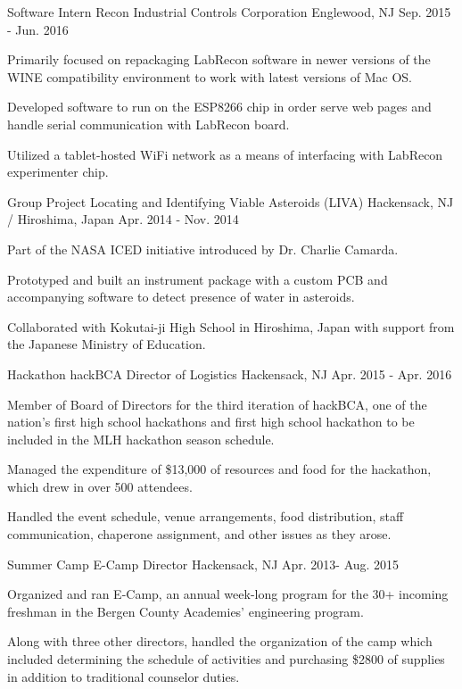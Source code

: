 \begin{cventries}
  \cventry
    {Software Intern}
    {Recon Industrial Controls Corporation}
    {Englewood, NJ}
    {Sep. 2015 - Jun. 2016}
    {
      \begin{cvitems}
        \item {Primarily focused on repackaging LabRecon software in newer versions of the
WINE compatibility environment to work with latest versions of Mac OS.}
        \item {Developed software to run on the ESP8266 chip in order serve web pages and
handle serial communication with LabRecon board.}
        \item {Utilized a tablet-hosted WiFi network as a means of interfacing with LabRecon
experimenter chip.}
      \end{cvitems}
    }
  \cventry
    {Group Project}
    {Locating and Identifying Viable Asteroids (LIVA)}
    {Hackensack, NJ / Hiroshima, Japan}
    {Apr. 2014 - Nov. 2014}
    {
      \begin{cvitems}
        \item {Part of the NASA ICED initiative introduced by Dr. Charlie Camarda.}
        \item {Prototyped and built an instrument package with a custom PCB and accompanying
software to detect presence of water in asteroids.}
        \item {Collaborated with Kokutai-ji High School in Hiroshima, Japan with support from the
Japanese Ministry of Education.}
      \end{cvitems}
    }
  \cventry
    {Hackathon}
    {hackBCA Director of Logistics}
    {Hackensack, NJ}
    {Apr. 2015 - Apr. 2016}
    {
      \begin{cvitems}
        \item {Member of Board of Directors for the third iteration of hackBCA, one of the nation's first high school hackathons and first high school hackathon to be included in the MLH hackathon season schedule.}
        \item {Managed the expenditure of \$13,000 of resources and food for the hackathon, which drew in over 500 attendees.}
        \item { Handled the event schedule, venue arrangements, food distribution, staff
communication, chaperone assignment, and other issues as they arose.}
      \end{cvitems}
    }
  \cventry
    {Summer Camp}
    {E-Camp Director}
    {Hackensack, NJ}
    {Apr. 2013- Aug. 2015}
    {
      \begin{cvitems}
        \item {Organized and ran E-Camp, an annual week-long program for the 30+ incoming freshman in
the Bergen County Academies' engineering program.}
        \item {Along with three other directors, handled the organization of the camp which
included determining the schedule of activities and purchasing \$2800 of supplies in addition to
traditional counselor duties.}
      \end{cvitems}
    }
  

\end{cventries}
